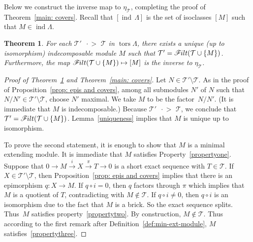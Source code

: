 \documentclass[10pt]{amsart}
\providecommand{\1}{}
\DeclareMathOperator{\tors}{tors}
\DeclareMathOperator{\image}{Im}
\DeclareMathOperator{\ind}{ind}
\newcommand{\calT}{\mathcal{T}}
\newcommand{\filt}{\mathscr{F}\Mk ilt}
\newcommand{\covers}{{\,\,\,\cdot\!\!\!\! >\,\,}}
\renewcommand{\1}{\hat{1}}
\newcommand{\0}{\hat{0}}
\newcommand*{\Mk}{\mkern -2mu}
\newtheorem{theorem}{Theorem}[section]
\theoremstyle{definition}
\begin{document}
Below we construct the inverse map to $\eta_\calT$, completing the proof of Theorem~\ref{main: covers}.
Recall that $[\ind\, \Lambda]$ is the set of isoclasses $[M]$ such that $M\in \ind \Lambda$.
\begin{theorem}\label{thm: eta inverse}
For each $\calT'\covers \calT$ in $\tors\Lambda$, there exists a unique (up to isomorphism) indecomposable module $M$ such that $\calT' = \filt(\calT \cup \{M\})$.
Furthermore, the map $\filt(\calT \cup \{M\}) \mapsto [M]$ is the inverse to $\eta_\calT$.
\end{theorem}
\begin{proof}[Proof of Theorem~\ref{thm: eta inverse} and Theorem~\ref{main: covers}]
Let $N\in \calT' \setminus \calT$.
As in the proof of Proposition~\ref{prop: epis and covers}, among all submodules $N'$ of $N$ such that $N/N'\in \calT'\setminus \calT$, choose $N'$ maximal.
We take $M$ to be the factor~$N/N'$.
(It is immediate that $M$ is indecomposable.)
Because $\calT'\covers \calT$, we conclude that $\calT' = \filt(\calT \cup \{M\})$.
Lemma~\ref{uniqueness} implies that $M$ is unique up to isomorphism.

To prove the second statement, it is enough to show that $M$ is a minimal extending module.
It is immediate that $M$ satisfies Property~\ref{propertyone}.
Suppose that $0\to M \stackrel{i}\rightarrow X\stackrel{\pi}\rightarrow T\rightarrow 0$ is a short exact sequence with $T\in \calT$.
If $X\in \calT'\setminus \calT$, then Proposition~\ref{prop: epis and
 covers} implies that there is an epimorphism $q: X\rightarrow
M$. If $q\circ i=0$, then $q$ factors through $\pi$ which implies that
$M$ is a quotient of $T$, contradicting with $M\notin \calT$. If
$q\circ i\neq 0$, then $q\circ i$ is an isomorphism due to the fact
that $M$ is a brick. So the exact sequence splits.
Thus~$M$ satisfies property~\ref{propertytwo}.
By construction, $M\not\in\calT$. Thus according to the first remark after Definition~\ref{def:min-ext-module}, $M$ satisfies~\ref{propertythree}.
\end{proof}
\end{document}
